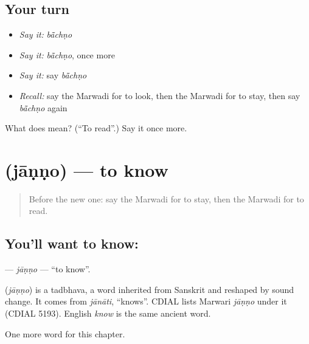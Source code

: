 \subsection*{Your turn}
\begin{itemize}
\raggedright
  \item \emph{Say it:} \emph{bā̃chṇo}
  \item \emph{Say it:} \emph{bā̃chṇo}, once more
  \item \emph{Say it:} say \emph{bā̃chṇo}
  \item \emph{Recall:} say the Marwadi for to look, then the Marwadi for to stay, then say \emph{bā̃chṇo} again
\end{itemize}

\begin{tcolorbox}[breakable,colback=teal!4,colframe=teal!35!black,title={Before you move on}]
What does  mean? (\textquotedblleft{}To read\textquotedblright{}.) Say it once more.
\end{tcolorbox}
\section[\texorpdfstring{\mw{जाणणो} (jāṇṇo)}{जाणणो (jāṇṇo)}]{ (jāṇṇo) — to know}

\label{lesson:MW-C105-janno}



\begin{quote}
Before the new one: say the Marwadi for to stay, then the Marwadi for to read.
\end{quote}

\subsection*{You'll want to know: }
\textbf{} — \emph{jāṇṇo} — \textquotedblleft{}to know\textquotedblright{}.

\begin{cousinweb}
\textbf{} (\emph{jāṇṇo}) is a tadbhava, a word inherited from Sanskrit and reshaped by sound change. It comes from \emph{jānāti}, \textquotedblleft{}knows\textquotedblright{}. CDIAL lists Marwari \emph{jāṇṇo} under it (CDIAL 5193). English \emph{know} is the same ancient word.
\end{cousinweb}

\begin{grammarlens}[title={What you've built}]
One more word for this chapter.
\end{grammarlens}

